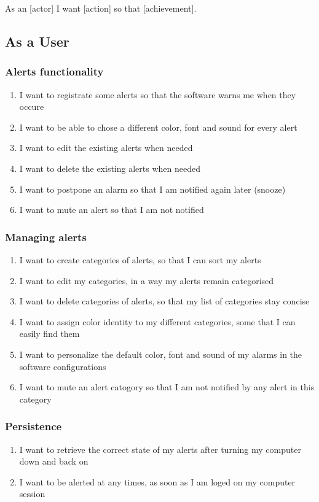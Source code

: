 As an [actor] I want [action] so that [achievement].

\subsection*{As a User}
\subsubsection{Alerts functionality}
\begin{enumerate}
	\item I want to registrate some alerts so that the software warns me when they occure
	\item I want to be able to chose a different color, font and sound for every alert
	\item I want to edit the existing alerts when needed
	\item I want to delete the existing alerts when needed
	\item I want to postpone an alarm so that I am notified again later (snooze)
	\item I want to mute an alert so that I am not notified
	\setcounter{counter}{\value{enumi}}
\end{enumerate}
\subsubsection{Managing alerts}
\begin{enumerate}
	\setcounter{enumi}{\value{counter}}
	\item I want to create categories of alerts, so that I can sort my alerts
	\item I want to edit my categories, in a way my alerts remain categorised
	\item I want to delete categories of alerts, so that my list of categories stay concise
	\item I want to assign color identity to my different categories, some that I can easily find them
	\item I want to personalize the default color, font and sound of my alarms in the software configurations
	\item I want to mute an alert catogory so that I am not notified by any alert in this category
	\setcounter{counter}{\value{enumi}}
\end{enumerate}
\subsubsection{Persistence}
\begin{enumerate}
	\setcounter{enumi}{\value{counter}}
	\item I want to retrieve the correct state of my alerts after turning my computer down and back on
	\item I want to be alerted at any times, as soon as I am loged on my computer session
	\setcounter{counter}{\value{enumi}}
\end{enumerate}
